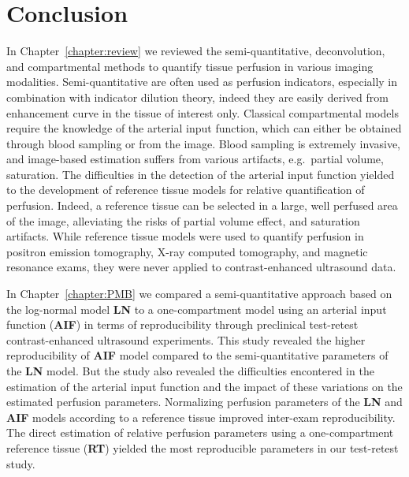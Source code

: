 \chapter{Conclusion}\label{chapter:conclusion}
In Chapter~\ref{chapter:review} we reviewed the semi-quantitative, deconvolution, and compartmental methods to quantify tissue perfusion in various imaging modalities.
Semi-quantitative are often used as perfusion indicators, especially in combination with indicator dilution theory, indeed they are easily derived from enhancement curve in the tissue of interest only.
Classical compartmental models require the knowledge of the arterial input function, which can either be obtained through blood sampling or from the image.
Blood sampling is extremely invasive, and image-based estimation suffers from various artifacts, e.g.~partial volume, saturation.
The difficulties in the detection of the arterial input function yielded to the development of reference tissue models for relative quantification of perfusion.
Indeed, a reference tissue can be selected in a large, well perfused area of the image, alleviating the risks of partial volume effect, and saturation artifacts.
While reference tissue models were used to quantify perfusion in positron emission tomography, X-ray computed tomography, and magnetic resonance exams, they were never applied to contrast-enhanced ultrasound data.

In Chapter~\ref{chapter:PMB} we compared a semi-quantitative approach based on the log-normal model \textbf{LN} to a one-compartment model using an arterial input function (\textbf{AIF}) in terms of reproducibility through preclinical test-retest contrast-enhanced ultrasound experiments.
This study revealed the higher reproducibility of \textbf{AIF} model compared to the semi-quantitative parameters of the \textbf{LN} model.
But the study also revealed the difficulties encontered in the estimation of the arterial input function and the impact of these variations on the estimated perfusion parameters.
Normalizing perfusion parameters of the \textbf{LN} and \textbf{AIF} models according to a reference tissue improved inter-exam reproducibility.
The direct estimation of relative perfusion parameters using a one-compartment reference tissue (\textbf{RT}) yielded the most reproducible parameters in our test-retest study.

